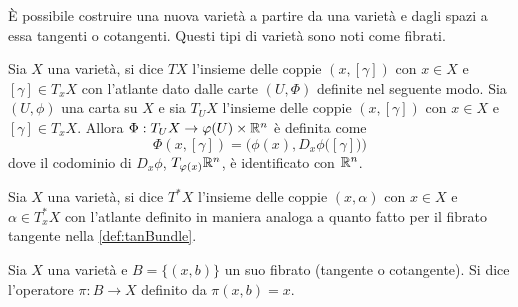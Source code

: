 È possibile costruire una nuova varietà a partire da una varietà e dagli spazi a essa tangenti o cotangenti. Questi tipi di varietà sono noti come fibrati.

\begin{definition} \label{def:tanBundle}
  Sia $X$ una varietà, si dice  $TX$ l'insieme delle coppie $(x,[\gamma])$ con $x \in X$ e $[\gamma] \in T_x X$ con l'atlante dato dalle carte $(U, \Phi)$ definite nel seguente modo. Sia $(U, \phi)$ una carta su $X$ e sia $T_U X$ l'insieme delle coppie $(x,[\gamma])$ con $x \in X$ e $[\gamma] \in T_x X$. Allora $\Phi:T_U X \to \varphi(U) \times \mathbb{R}^{n}$ è definita come \begin{equation}
  \Phi(x,[\gamma]) = \Big(\phi(x), D_x \phi\big([\gamma]\big)\Big)
  \end{equation} 
  dove il codominio di $D_x \phi$, $T_{\varphi(x)}\mathbb{R}^{n}$, è identificato con $\mathbb{R}^{n}$.
\end{definition}
\begin{definition}
  Sia $X$ una varietà, si dice  $T^*X$ l'insieme delle coppie $(x,\alpha)$ con $x \in X$ e $\alpha \in T^*_x X$ con l'atlante definito in maniera analoga a quanto fatto per il fibrato tangente nella \autoref{def:tanBundle}.
\end{definition}
\begin{definition}
  Sia $X$ una varietà e $B=\{(x,b)\}$ un suo fibrato (tangente o cotangente). Si dice  l'operatore $\pi: B \to X$ definito da $\pi(x,b) = x$.
\end{definition}